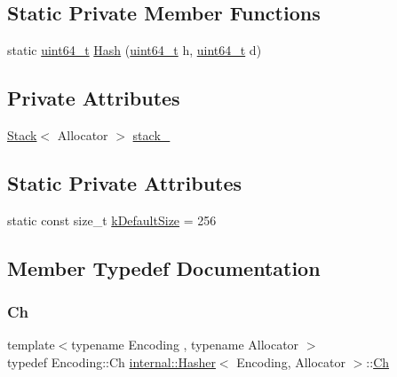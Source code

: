 \subsection*{Static Private Member Functions}
\begin{DoxyCompactItemize}
\item 
static \hyperlink{stdint_8h_aec6fcb673ff035718c238c8c9d544c47}{uint64\+\_\+t} \hyperlink{classinternal_1_1Hasher_ac8c84069bfdefdc503e4446f7adc1e12}{Hash} (\hyperlink{stdint_8h_aec6fcb673ff035718c238c8c9d544c47}{uint64\+\_\+t} h, \hyperlink{stdint_8h_aec6fcb673ff035718c238c8c9d544c47}{uint64\+\_\+t} d)
\end{DoxyCompactItemize}
\subsection*{Private Attributes}
\begin{DoxyCompactItemize}
\item 
\hyperlink{classinternal_1_1Stack}{Stack}$<$ Allocator $>$ \hyperlink{classinternal_1_1Hasher_aeae42411c1a82c0f26d2e0bff68ac4f4}{stack\+\_\+}
\end{DoxyCompactItemize}
\subsection*{Static Private Attributes}
\begin{DoxyCompactItemize}
\item 
static const size\+\_\+t \hyperlink{classinternal_1_1Hasher_a0a07e0306af8d4a3a87e88423c9e47a7}{k\+Default\+Size} = 256
\end{DoxyCompactItemize}


\subsection{Member Typedef Documentation}
\mbox{\label{classinternal_1_1Hasher_a415970af68a067615c3c95306cff6d43}} 
\subsubsection{\texorpdfstring{Ch}{Ch}}
{\footnotesize\ttfamily template$<$typename Encoding , typename Allocator $>$ \\
typedef Encoding\+::\+Ch \hyperlink{classinternal_1_1Hasher}{internal\+::\+Hasher}$<$ Encoding, Allocator $>$\+::\hyperlink{classinternal_1_1Hasher_a415970af68a067615c3c95306cff6d43}{Ch}}



